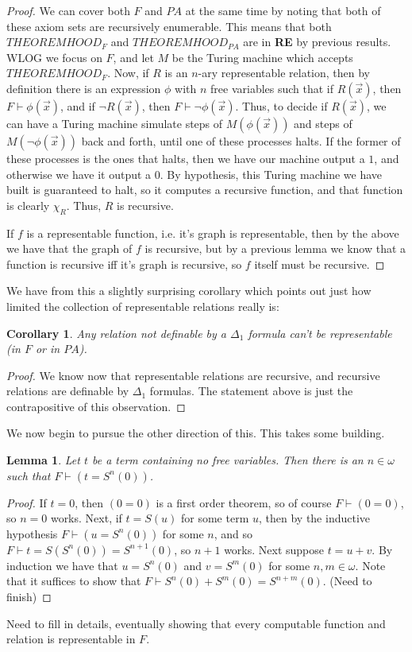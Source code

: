 \documentclass{article}
\theoremstyle{definition}
\theoremstyle{plain}
\theoremstyle{theorem}
\newtheorem{lemma}{Lemma}[section]
\newtheorem{corollary}{Corollary}[section]
\begin{document}
\begin{proof}
    We can cover both $F$ and $PA$ at the same time by noting that both of these axiom sets are recursively enumerable. This means that both $THEOREMHOOD_F$ and $THEOREMHOOD_{PA}$ are in \textbf{RE} by previous results. WLOG we focus on $F$, and let $M$ be the Turing machine which accepts $THEOREMHOOD_F$. Now, if $R$ is an $n$-ary representable relation, then by definition there is an expression $\phi$ with $n$ free variables such that if $R(\vec{x})$, then $F \vdash \phi(\vec{x})$, and if $\neg R(\vec{x})$, then $F \vdash \neg \phi(\vec{x})$. Thus, to decide if $R(\vec{x})$, we can have a Turing machine simulate steps of $M(\phi(\vec{x}))$ and steps of $M(\neg \phi(\vec{x}))$ back and forth, until one of these processes halts. If the former of these processes is the ones that halts, then we have our machine output a $1$, and otherwise we have it output a $0$. By hypothesis, this Turing machine we have built is guaranteed to halt, so it computes a recursive function, and that function is clearly $\chi_R$. Thus, $R$ is recursive.
    \par If $f$ is a representable function, i.e. it's graph is representable, then by the above we have that the graph of $f$ is recursive, but by a previous lemma we know that a function is recursive iff it's graph is recursive, so $f$ itself must be recursive.
\end{proof}
We have from this a slightly surprising corollary which points out just how limited the collection of representable relations really is:
\begin{corollary}
   Any relation not definable by a $\Delta_1$ formula can't be representable (in $F$ or in $PA$). 
\end{corollary}
\begin{proof}
    We know now that representable relations are recursive, and recursive relations are definable by $\Delta_1$ formulas. The statement above is just the contrapositive of this observation.
\end{proof}
We now begin to pursue the other direction of this. This takes some building.
\begin{lemma}
    Let $t$ be a term containing no free variables. Then there is an $n \in \mathbb{\omega}$ such that $F \vdash (t = S^n(0))$.
\end{lemma}
\begin{proof}
    If $t = 0$, then $(0 = 0)$ is a first order theorem, so of course $F \vdash (0=0)$, so $n=0$ works. Next, if $t = S(u)$ for some term $u$, then by the inductive hypothesis $F \vdash (u = S^n(0))$ for some $n$, and so $F \vdash t = S(S^n(0)) = S^{n+1}(0)$, so $n+1$ works. Next suppose $t = u+v$. By induction we have that $u = S^n(0)$ and $v = S^m(0)$ for some $n,m \in \omega$. Note that it suffices to show that $F \vdash S^n(0)+S^m(0) = S^{n+m}(0)$. (Need to finish)
\end{proof}
Need to fill in details, eventually showing that every computable function and relation is representable in $F$.
\end{document}
